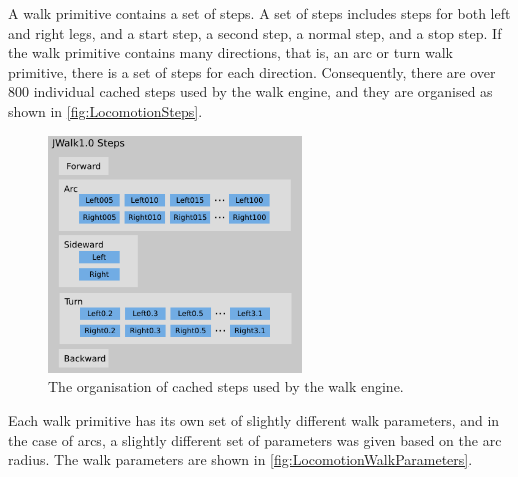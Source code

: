 A walk primitive contains a set of steps. A set of steps includes steps for both left and right legs, and a start step, a second step, a normal step, and a stop step. If the walk primitive contains many directions, that is, an arc or turn walk primitive, there is a set of steps for each direction. Consequently, there are over 800 individual cached steps used by the walk engine, and they are organised as shown in \autoref{fig:LocomotionSteps}.

\begin{figure}[tbh]
	\begin{center}
		\includegraphics[width=0.6\textwidth]{locomotionfigs/steps.png}
		\caption{The organisation of cached steps used by the walk engine.}
		\label{fig:LocomotionSteps}
	\end{center}
\end{figure}

Each walk primitive has its own set of slightly different walk parameters, and in the case of arcs, a slightly different set of parameters was given based on the arc radius. The walk parameters are shown in \autoref{fig:LocomotionWalkParameters}.

